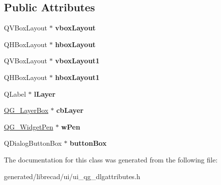 \subsection*{Public Attributes}
\begin{DoxyCompactItemize}
\item 
\hypertarget{classUi__QG__DlgAttributes_a5f423784f556a09457809bafc4d2a49f}{Q\-V\-Box\-Layout $\ast$ {\bfseries vbox\-Layout}}\label{classUi__QG__DlgAttributes_a5f423784f556a09457809bafc4d2a49f}

\item 
\hypertarget{classUi__QG__DlgAttributes_a7193d8c2c254f9fee4eeb47c77d524cc}{Q\-H\-Box\-Layout $\ast$ {\bfseries hbox\-Layout}}\label{classUi__QG__DlgAttributes_a7193d8c2c254f9fee4eeb47c77d524cc}

\item 
\hypertarget{classUi__QG__DlgAttributes_a5d1a79e5d43fdfc3a4bfe806569a28d3}{Q\-V\-Box\-Layout $\ast$ {\bfseries vbox\-Layout1}}\label{classUi__QG__DlgAttributes_a5d1a79e5d43fdfc3a4bfe806569a28d3}

\item 
\hypertarget{classUi__QG__DlgAttributes_a5cfed3cb4ab87942eaa7dd9cf8cc8d04}{Q\-H\-Box\-Layout $\ast$ {\bfseries hbox\-Layout1}}\label{classUi__QG__DlgAttributes_a5cfed3cb4ab87942eaa7dd9cf8cc8d04}

\item 
\hypertarget{classUi__QG__DlgAttributes_a0d113b650e61f7de1d30796ba1769a08}{Q\-Label $\ast$ {\bfseries l\-Layer}}\label{classUi__QG__DlgAttributes_a0d113b650e61f7de1d30796ba1769a08}

\item 
\hypertarget{classUi__QG__DlgAttributes_ad51b16900e68cd29909decd7799d787b}{\hyperlink{classQG__LayerBox}{Q\-G\-\_\-\-Layer\-Box} $\ast$ {\bfseries cb\-Layer}}\label{classUi__QG__DlgAttributes_ad51b16900e68cd29909decd7799d787b}

\item 
\hypertarget{classUi__QG__DlgAttributes_a27766cf35a9fc959e600ea0c426b5d49}{\hyperlink{classQG__WidgetPen}{Q\-G\-\_\-\-Widget\-Pen} $\ast$ {\bfseries w\-Pen}}\label{classUi__QG__DlgAttributes_a27766cf35a9fc959e600ea0c426b5d49}

\item 
\hypertarget{classUi__QG__DlgAttributes_a52ba41d991949892d2406f8851c19c4f}{Q\-Dialog\-Button\-Box $\ast$ {\bfseries button\-Box}}\label{classUi__QG__DlgAttributes_a52ba41d991949892d2406f8851c19c4f}

\end{DoxyCompactItemize}


The documentation for this class was generated from the following file\-:\begin{DoxyCompactItemize}
\item 
generated/librecad/ui/ui\-\_\-qg\-\_\-dlgattributes.\-h\end{DoxyCompactItemize}
